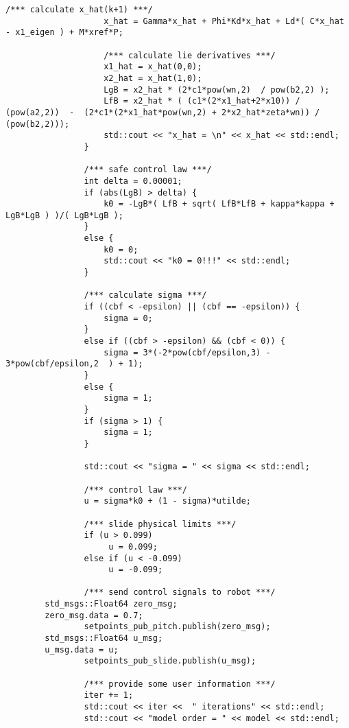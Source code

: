\begin{lstlisting}[language=gedit]
                    /*** calculate x_hat(k+1) ***/
                    x_hat = Gamma*x_hat + Phi*Kd*x_hat + Ld*( C*x_hat - x1_eigen ) + M*xref*P;

                    /*** calculate lie derivatives ***/
                    x1_hat = x_hat(0,0);
                    x2_hat = x_hat(1,0);
                    LgB = x2_hat * (2*c1*pow(wn,2)  / pow(b2,2) );
                    LfB = x2_hat * ( (c1*(2*x1_hat+2*x10)) / (pow(a2,2))  -  (2*c1*(2*x1_hat*pow(wn,2) + 2*x2_hat*zeta*wn)) / (pow(b2,2)));          
                    std::cout << "x_hat = \n" << x_hat << std::endl;
                }

                /*** safe control law ***/
                int delta = 0.00001;
                if (abs(LgB) > delta) {
                    k0 = -LgB*( LfB + sqrt( LfB*LfB + kappa*kappa + LgB*LgB ) )/( LgB*LgB );
                }
                else {
                    k0 = 0;
                    std::cout << "k0 = 0!!!" << std::endl;
                }          
 
                /*** calculate sigma ***/
                if ((cbf < -epsilon) || (cbf == -epsilon)) {
                    sigma = 0;
                }
                else if ((cbf > -epsilon) && (cbf < 0)) {
                    sigma = 3*(-2*pow(cbf/epsilon,3) - 3*pow(cbf/epsilon,2	) + 1);
                }
                else {
                    sigma = 1;
                }
                if (sigma > 1) {
                    sigma = 1;
                }
               
                std::cout << "sigma = " << sigma << std::endl;

                /*** control law ***/
                u = sigma*k0 + (1 - sigma)*utilde;

                /*** slide physical limits ***/
                if (u > 0.099)
                     u = 0.099;
                else if (u < -0.099)
                     u = -0.099;
                
                /*** send control signals to robot ***/
		std_msgs::Float64 zero_msg;
		zero_msg.data = 0.7;
                setpoints_pub_pitch.publish(zero_msg);
		std_msgs::Float64 u_msg;
		u_msg.data = u;
                setpoints_pub_slide.publish(u_msg);

                /*** provide some user information ***/
                iter += 1;
                std::cout << iter <<  " iterations" << std::endl;
                std::cout << "model order = " << model << std::endl;


\end{lstlisting}
